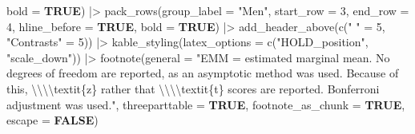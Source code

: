 \documentclass[
  bookmarksnumbered]{article}
\newenvironment{Shaded}{\begin{snugshade}}{\end{snugshade}}
\newcommand{\AttributeTok}[1]{\textcolor[rgb]{0.80,0.80,0.80}{#1}}
\newcommand{\ConstantTok}[1]{\textcolor[rgb]{0.86,0.64,0.64}{\textbf{#1}}}
\newcommand{\DecValTok}[1]{\textcolor[rgb]{0.86,0.86,0.80}{#1}}
\newcommand{\FunctionTok}[1]{\textcolor[rgb]{0.94,0.94,0.56}{#1}}
\newcommand{\NormalTok}[1]{\textcolor[rgb]{0.80,0.80,0.80}{#1}}
\newcommand{\OtherTok}[1]{\textcolor[rgb]{0.94,0.94,0.56}{#1}}
\newcommand{\SpecialCharTok}[1]{\textcolor[rgb]{0.86,0.64,0.64}{#1}}
\newcommand{\StringTok}[1]{\textcolor[rgb]{0.80,0.58,0.58}{#1}}
\begin{document}
\begin{Shaded}
\begin{Highlighting}[]
            \AttributeTok{bold =} \ConstantTok{TRUE}\NormalTok{) }\SpecialCharTok{|\textgreater{}}
  \FunctionTok{pack\_rows}\NormalTok{(}\AttributeTok{group\_label =} \StringTok{"Men"}\NormalTok{,}
            \AttributeTok{start\_row =} \DecValTok{3}\NormalTok{,}
            \AttributeTok{end\_row =} \DecValTok{4}\NormalTok{,}
            \AttributeTok{hline\_before =} \ConstantTok{TRUE}\NormalTok{,}
            \AttributeTok{bold =} \ConstantTok{TRUE}\NormalTok{) }\SpecialCharTok{|\textgreater{}}
  \FunctionTok{add\_header\_above}\NormalTok{(}\FunctionTok{c}\NormalTok{(}\StringTok{" "} \OtherTok{=} \DecValTok{5}\NormalTok{, }\StringTok{"Contrasts"} \OtherTok{=} \DecValTok{5}\NormalTok{)) }\SpecialCharTok{|\textgreater{}} 
  \FunctionTok{kable\_styling}\NormalTok{(}\AttributeTok{latex\_options =} \FunctionTok{c}\NormalTok{(}\StringTok{"HOLD\_position"}\NormalTok{, }\StringTok{"scale\_down"}\NormalTok{)) }\SpecialCharTok{|\textgreater{}}
  \FunctionTok{footnote}\NormalTok{(}\AttributeTok{general =} \StringTok{"EMM = estimated marginal mean.}
\StringTok{           No degrees of freedom are reported, as an asymptotic method was used. }
\StringTok{           Because of this, }\SpecialCharTok{\textbackslash{}\textbackslash{}\textbackslash{}\textbackslash{}}\StringTok{textit\{z\} rather that }\SpecialCharTok{\textbackslash{}\textbackslash{}\textbackslash{}\textbackslash{}}\StringTok{textit\{t\} scores are reported.}
\StringTok{           Bonferroni adjustment was used."}\NormalTok{,}
           \AttributeTok{threeparttable =} \ConstantTok{TRUE}\NormalTok{,}
           \AttributeTok{footnote\_as\_chunk =} \ConstantTok{TRUE}\NormalTok{,}
           \AttributeTok{escape =} \ConstantTok{FALSE}\NormalTok{)}
\end{Highlighting}
\end{Shaded}
\end{document}
